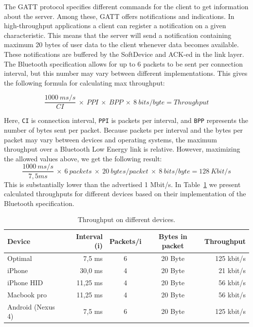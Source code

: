 The GATT protocol specifies different commands for the client to get information about the server. Among these, GATT offers notifications and indications. In high-throughput applications a client can register a notification on a given characteristic. This means that the server will send a notification containing maximum 20 bytes of user data to the client whenever data becomes available. These notifications are buffered by the SoftDevice and ACK-ed in the link layer. The Bluetooth specification allows for up to 6 packets to be sent per connection interval, but this number may vary between different implementations. This gives the following formula for calculating max throughput:

\[
\frac{1000\: ms/s}{CI}\: \times\: PPI\: \times\: BPP\: \times\: 8\: bits/byte = Throughput
\]

\newline
\noindent
Here, \texttt{CI} is connection interval, \texttt{PPI} is packets per interval, and \texttt{BPP} represents the number of bytes sent per packet. Because packets per interval and the bytes per packet may vary between devices and operating systems, the maximum throughput over a Bluetooth Low Energy link is relative. However, maximizing the allowed values above, we get the following result: 
\[
\frac{1000\: ms/s}{7,5ms}\: \times\: 6\: packets\: \times\: 20\:bytes/packet\: \times\: 8\: bits/byte = 128\:Kbit/s
\]
\newline
\noindent
This is substantially lower than the advertised 1 Mbit/s. In Table~\ref{tab:ble_device_throughput} we present calculated throughputs for different devices based on their implementation of the Bluetooth specification.

\begin{table}[]
\centering
\caption{Throughput on different devices.}
\label{tab:ble_device_throughput}
\begin{tabular}{@{}lrccr@{}}
\toprule
\textbf{Device}   & \textbf{Interval (i)} & \textbf{Packets/i} & \textbf{Bytes in packet} & \textbf{Throughput} \\ \midrule
Optimal	          & 7,5 ms	  & 6	  & 20 Byte	  & 125 kbit/s \\
iPhone	          & 30,0 ms	  & 4	  & 20 Byte	  & 21 kbit/s   \\
iPhone HID	      & 11,25 ms	& 4	  & 20 Byte	  & 56 kbit/s \\
Macbook pro	      & 11,25 ms	& 4	  & 20 Byte	  & 56 kbit/s \\
Android (Nexus 4)	& 7,5 ms	  & 6	  & 20 Byte	  & 125 kbit/s  \\ \bottomrule
\end{tabular}
\end{table}


